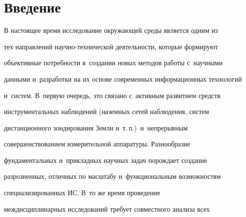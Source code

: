 




















      \thispagestyle{headings}


      


      \vspace*{-10pt} 





\section{Введение}





     В настоящее время исследование окружающей среды является одним из 


тех направлений на\-уч\-но-тех\-ни\-че\-ской деятельности, которые формируют 


объективные потребности в~создании новых методов работы с~научными 


данными и~разработки на их основе современных информационных технологий 


и~систем. В~первую очередь, это связано с~активным развитием средств 


инструментальных наблюдений (наземных сетей наблюдения, систем 


дистанционного зондирования Земли и~т.\,п.)\ и~непрерывным 


совершенствованием измерительной аппаратуры. Разнообразие 


фундаментальных и~прикладных научных задач порождает создание 


разрозненных, отличных по масштабу и~функциональным возможностям 


специализированных ИС. В~то же время проведение 


междисциплинарных исследований требует совместного анализа всех 


